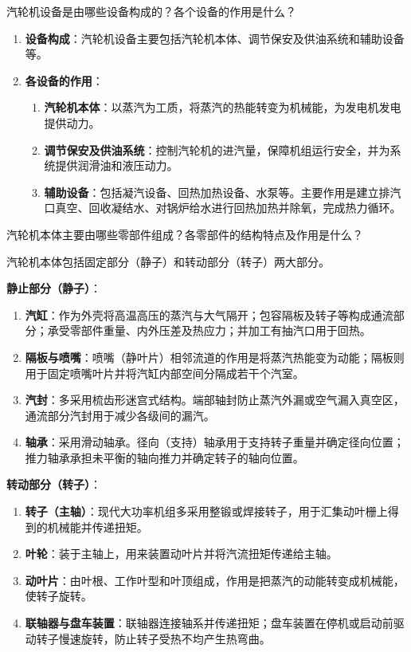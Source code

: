 \begin{problem}
汽轮机设备是由哪些设备构成的？各个设备的作用是什么？
\end{problem}

\begin{solution}
\begin{enumerate}
  \item \textbf{设备构成}：汽轮机设备主要包括汽轮机本体、调节保安及供油系统和辅助设备等。
  \item \textbf{各设备的作用}：
  \begin{enumerate}
    \item \textbf{汽轮机本体}：以蒸汽为工质，将蒸汽的热能转变为机械能，为发电机发电提供动力。
    \item \textbf{调节保安及供油系统}：控制汽轮机的进汽量，保障机组运行安全，并为系统提供润滑油和液压动力。
    \item \textbf{辅助设备}：包括凝汽设备、回热加热设备、水泵等。主要作用是建立排汽口真空、回收凝结水、对锅炉给水进行回热加热并除氧，完成热力循环。
  \end{enumerate}
\end{enumerate}
\end{solution}

\begin{problem}
汽轮机本体主要由哪些零部件组成？各零部件的结构特点及作用是什么？
\end{problem}

\begin{solution}
汽轮机本体包括固定部分（静子）和转动部分（转子）两大部分。

\textbf{静止部分（静子）}：
\begin{enumerate}
  \item \textbf{汽缸}：作为外壳将高温高压的蒸汽与大气隔开；包容隔板及转子等构成通流部分；承受零部件重量、内外压差及热应力；并加工有抽汽口用于回热。
  \item \textbf{隔板与喷嘴}：喷嘴（静叶片）相邻流道的作用是将蒸汽热能变为动能；隔板则用于固定喷嘴叶片并将汽缸内部空间分隔成若干个汽室。
  \item \textbf{汽封}：多采用梳齿形迷宫式结构。端部轴封防止蒸汽外漏或空气漏入真空区，通流部分汽封用于减少各级间的漏汽。
  \item \textbf{轴承}：采用滑动轴承。径向（支持）轴承用于支持转子重量并确定径向位置；推力轴承承担未平衡的轴向推力并确定转子的轴向位置。
\end{enumerate}

\textbf{转动部分（转子）}：
\begin{enumerate}
  \item \textbf{转子（主轴）}：现代大功率机组多采用整锻或焊接转子，用于汇集动叶栅上得到的机械能并传递扭矩。
  \item \textbf{叶轮}：装于主轴上，用来装置动叶片并将汽流扭矩传递给主轴。
  \item \textbf{动叶片}：由叶根、工作叶型和叶顶组成，作用是把蒸汽的动能转变成机械能，使转子旋转。
  \item \textbf{联轴器与盘车装置}：联轴器连接轴系并传递扭矩；盘车装置在停机或启动前驱动转子慢速旋转，防止转子受热不均产生热弯曲。
\end{enumerate}
\end{solution}

